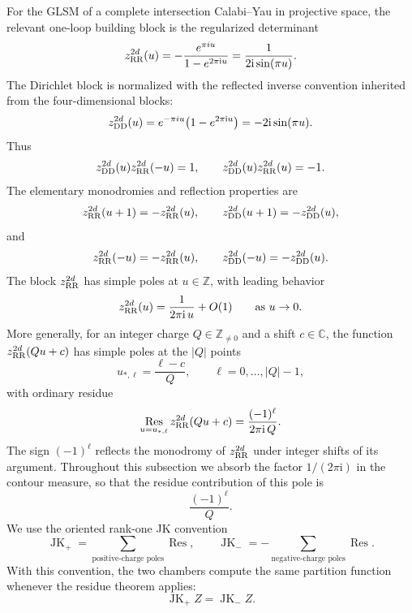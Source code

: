 \documentclass[11pt,a4paper]{article}
\numberwithin{equation}{section}
\theoremstyle{plain}
\theoremstyle{definition}
\theoremstyle{remark}
\newcommand{\ii}{\mathrm{i}}
\begin{document}
For the GLSM of a complete intersection Calabi--Yau in projective space, the relevant one-loop building block is the regularized determinant
\begin{equation}
z_{\rm RR}^{2d}(u)
=
-\frac{e^{\pi i u}}{1-e^{2\pi \ii u}}
=
\frac{1}{2 \ii\sin(\pi u)}.
\end{equation}
The Dirichlet block is normalized with the reflected inverse convention inherited from the four-dimensional blocks:
\begin{equation}
z_{\rm DD}^{2d}(u)
=
e^{-\pi i u}\bigl(1-e^{2\pi \ii u}\bigr)
=
-2\ii\sin(\pi u).
\end{equation}
Thus
\begin{equation}
z_{\rm DD}^{2d}(u)z_{\rm RR}^{2d}(-u)=1,
\qquad
z_{\rm DD}^{2d}(u)z_{\rm RR}^{2d}(u)=-1.
\end{equation}
The elementary monodromies and reflection properties are
\begin{equation}
z_{\rm RR}^{2d}(u+1)=-z_{\rm RR}^{2d}(u),
\qquad
z_{\rm DD}^{2d}(u+1)=-z_{\rm DD}^{2d}(u),
\end{equation}
and
\begin{equation}
z_{\rm RR}^{2d}(-u)=-z_{\rm RR}^{2d}(u),
\qquad
z_{\rm DD}^{2d}(-u)=-z_{\rm DD}^{2d}(u).
\end{equation}
The block \(z_{\rm RR}^{2d}\) has simple poles at \(u\in\mathbb Z\), with leading behavior
\begin{equation}
z_{\rm RR}^{2d}(u)
=
\frac{1}{2\pi \ii\,u}+O(1)
\qquad\text{as }u\to 0.
\end{equation}
More generally, for an integer charge \(Q\in\mathbb Z_{\ne 0}\) and a shift \(c\in\mathbb C\), the function \(z_{\rm RR}^{2d}(Q u+c)\) has simple poles at the \(|Q|\) points
\begin{equation}
u_{*,\ell}=\frac{\ell-c}{Q},
\qquad
\ell=0,\ldots,|Q|-1,
\end{equation}
with ordinary residue
\begin{equation}
\operatorname*{Res}_{u=u_{*,\ell}}
z_{\rm RR}^{2d}(Q u+c)
=
\frac{(-1)^{\ell}}{2\pi \ii\,Q}.
\label{eq:ci-local-residue-2d}
\end{equation}
The sign \((-1)^\ell\) reflects the monodromy of \(z_{\rm RR}^{2d}\) under integer shifts of its argument. Throughout this subsection we absorb the factor \(1/(2\pi \ii)\) in the contour measure, so that the residue contribution of this pole is
\begin{equation}
\frac{(-1)^\ell}{Q}.
\end{equation}
We use the oriented rank-one JK convention
\begin{equation}
\operatorname{JK}_{+}
=
\sum_{\text{positive-charge poles}}\operatorname{Res},
\qquad
\operatorname{JK}_{-}
=
-\sum_{\text{negative-charge poles}}\operatorname{Res}.
\label{eq:ci-oriented-JK-definition}
\end{equation}
With this convention, the two chambers compute the same partition function whenever the residue theorem applies:
\begin{equation}
\operatorname{JK}_{+}Z=\operatorname{JK}_{-}Z.
\end{equation}
\end{document}

